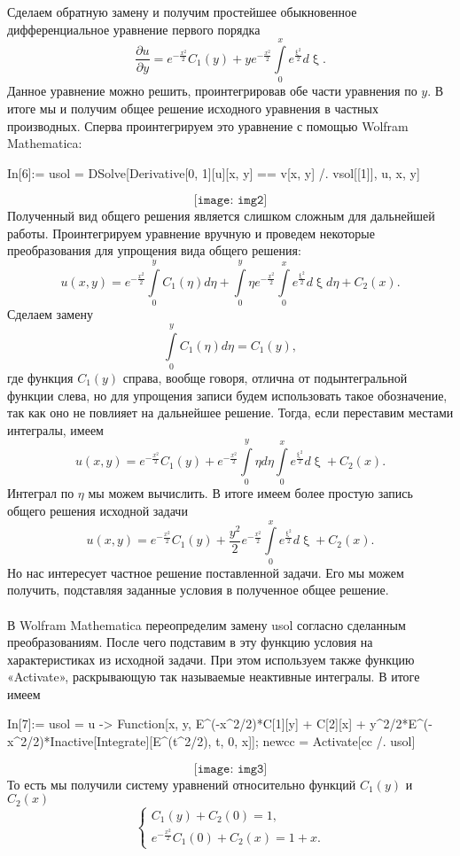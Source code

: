 \documentclass[a4paper, 12pt]{report}
\renewcommand{\xi}{\upxi}
\begin{document}
Сделаем обратную замену и получим простейшее обыкновенное дифференциальное уравнение первого порядка
$$\dfrac{\partial u}{\partial y} = e^{-\frac{x^2}{2}}C_1(y) + ye^{-\frac{x^2}{2}} \int\limits_0^x e^{\frac{\xi^2}{2}}d\xi.$$
Данное уравнение можно решить, проинтегрировав обе части уравнения по $y$. В итоге мы и получим общее решение исходного уравнения в частных производных. Сперва проинтегрируем это уравнение с помощью Wolfram Mathematica:
\begin{listingcont}
In[6]:= usol = DSolve[Derivative[0, 1][u][x, y] == v[x, y] /. 
vsol[[1]], u, {x, y}]
\end{listingcont}
$$
	\texttt{[image: img2]}
$$
Полученный вид общего решения является слишком сложным для дальнейшей работы. Проинтегрируем уравнение вручную и проведем некоторые преобразования для упрощения вида общего решения:
$$u(x,y) = e^{-\frac{x^2}{2}}\int\limits_0^yC_1(\eta)d\eta + \int\limits_0^y\eta e^{-\frac{x^2}{2}} \int\limits_0^x e^{\frac{\xi^2}{2}}d\xi d\eta + C_2(x).$$
Сделаем замену $$\int\limits_0^yC_1(\eta)d\eta = C_1(y),$$
где функция $C_1(y)$ справа, вообще говоря, отлична от подынтегральной функции слева, но для упрощения записи будем использовать такое обозначение, так как оно не повлияет на дальнейшее решение. Тогда, если переставим местами интегралы, имеем
$$u(x,y) = e^{-\frac{x^2}{2}}C_1(y) + e^{-\frac{x^2}{2}}\int\limits_0^y\eta d\eta  \int\limits_0^x e^{\frac{\xi^2}{2}}d\xi + C_2(x).$$
Интеграл по $\eta$ мы можем вычислить. В итоге имеем более простую запись общего решения исходной задачи
$$u(x,y) = e^{-\frac{x^2}{2}}C_1(y) + \dfrac{y^2}{2}e^{-\frac{x^2}{2}}\int\limits_0^x e^{\frac{\xi^2}{2}}d\xi + C_2(x).$$
Но нас интересует частное решение поставленной задачи. Его мы можем получить, подставляя заданные условия в полученное общее решение.\\\\
В Wolfram Mathematica переопределим замену usol согласно сделанным преобразованиям. После чего подставим в эту функцию условия на характеристиках из исходной задачи. При этом используем также функцию «Activate», раскрывающую так называемые неактивные интегралы. В итоге имеем
\begin{listingcont}
In[7]:= usol = 
	u -> Function[{x, y}, E^(-x^2/2)*C[1][y] + C[2][x] +
		y^2/2*E^(-x^2/2)*Inactive[Integrate][E^(t^2/2), {t, 0, x}]];
newcc = Activate[cc /. usol]
\end{listingcont}
$$
	\texttt{[image: img3]}
$$
То есть мы получили систему уравнений относительно функций $C_1(y)$ и $C_2(x)$
$$\begin{cases}
C_1(y) + C_2(0) = 1,\\
e^{-\frac{x^2}{2}} C_1(0) + C_2(x) = 1+x.
\end{cases}$$
\end{document}
